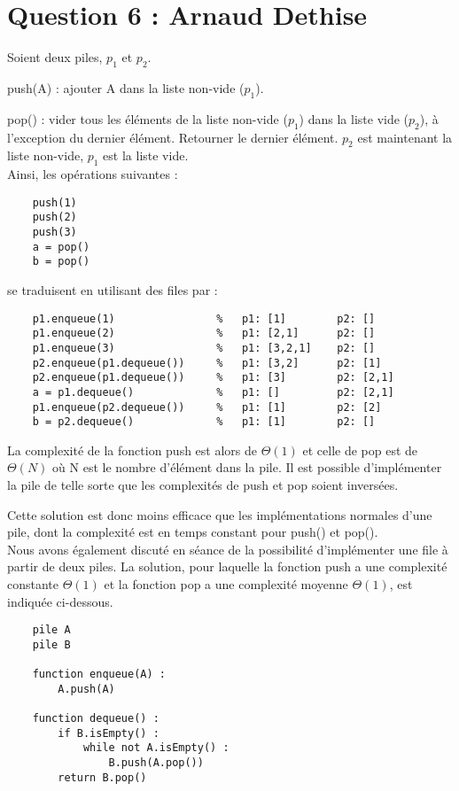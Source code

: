 \section*{Question 6 : Arnaud Dethise}

Soient deux piles, $p_{1}$ et $p_{2}$.

push(A) : ajouter A dans la liste non-vide ($p_{1}$).

pop() : vider tous les éléments de la liste non-vide ($p_{1}$) dans la liste vide ($p_{2}$), à l'exception du dernier élément. Retourner le dernier élément. $p_{2}$ est maintenant la liste non-vide, $p_{1}$ est la liste vide.\\

Ainsi, les opérations suivantes :
\begin{lstlisting}
	push(1)
	push(2)
	push(3)
	a = pop()
	b = pop()
\end{lstlisting}
se traduisent en utilisant des files par :
\begin{lstlisting}
	p1.enqueue(1)                %   p1: [1]        p2: []
	p1.enqueue(2)                %   p1: [2,1]      p2: []
	p1.enqueue(3)                %   p1: [3,2,1]    p2: []
	p2.enqueue(p1.dequeue())     %   p1: [3,2]      p2: [1]
	p2.enqueue(p1.dequeue())     %   p1: [3]        p2: [2,1]
	a = p1.dequeue()             %   p1: []         p2: [2,1]
	p1.enqueue(p2.dequeue())     %   p1: [1]        p2: [2]
	b = p2.dequeue()             %   p1: [1]        p2: []
\end{lstlisting}

La complexité de la fonction push est alors de $\Theta(1)$ et celle de pop est de $\Theta(N)$ où N est le nombre d'élément dans la pile. Il est possible d'implémenter la pile de telle sorte que les complexités de push et pop soient inversées.

Cette solution est donc moins efficace que les implémentations normales d'une pile, dont la complexité est en temps constant pour push() et pop().\\

Nous avons également discuté en séance de la possibilité d'implémenter une file à partir de deux piles. La solution, pour laquelle la fonction push a une complexité constante $\Theta(1)$ et la fonction pop a une complexité moyenne $\Theta(1)$, est indiquée ci-dessous.

\begin{lstlisting}
	pile A
	pile B
	
	function enqueue(A) :
		A.push(A)
		
	function dequeue() :
		if B.isEmpty() :
			while not A.isEmpty() :
				B.push(A.pop())
		return B.pop()
\end{lstlisting}